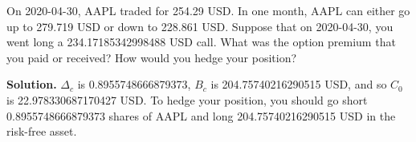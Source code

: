 \noindent On 2020-04-30, AAPL traded for 254.29 USD. In one month, AAPL can either go up to 279.719 USD or down to 228.861 USD. Suppose that on 2020-04-30, you went long a 234.17185342998488 USD call. What was the option premium that you paid or received? How would you hedge your position?

\vspace{9pt}

\noindent\textbf{Solution.} $\Delta_{c}$ is 0.8955748666879373, $B_{c}$ is 204.75740216290515 USD, and so $C_{0}$ is 22.978330687170427 USD. To hedge your position, you should go short 0.8955748666879373 shares of AAPL and long 204.75740216290515 USD in the risk-free asset.